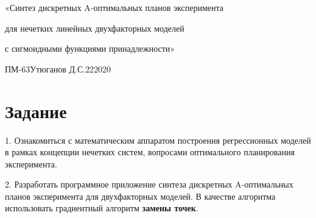 ﻿%

\newcommand{\rb}[1]{ \left( #1 \right) }

\newcommand{\sqbr}[1]{ \left[ #1 \right]}

\newcommand{\InsertImage}[2]
{
    \begin{center}
        \texttt{[image: \#2]}        
    \end{center}
}

\newcommand{\InsertFourImages}[5]
{
    \begin{center}
        \texttt{[image: \#2]}
        \texttt{[image: \#3]}
    \end{center}
    \begin{center}
        \texttt{[image: \#4]}
        \texttt{[image: \#5]}
    \end{center}
}


{«Синтез  дискретных A-оптимальных  планов эксперимента 

для нечетких линейных двухфакторных моделей 

с сигмоидными функциями принадлежности»}
{ПМ-63}{Утюганов Д.С.}{22}{2020}



\section{Задание}

1. Ознакомиться с математическим аппаратом построения регрессионных моделей в рамках
концепции нечетких систем, вопросами оптимального планирования эксперимента.

2. Разработать  программное  приложение  синтеза дискретных A-оптимальных планов 
эксперимента  для  двухфакторных  моделей. В  качестве  алгоритма использовать
градиентный алгоритм \textbf{замены точек}.

